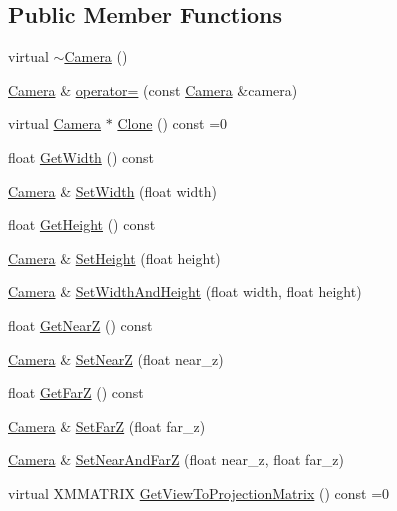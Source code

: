 \subsection*{Public Member Functions}
\begin{DoxyCompactItemize}
\item 
virtual \hyperlink{classmage_1_1_camera_ae56c0542ae1a480c7fb15d737bf16de0}{$\sim$\+Camera} ()
\item 
\hyperlink{classmage_1_1_camera}{Camera} \& \hyperlink{classmage_1_1_camera_ae16a5f66b80f7fa771475aa1eb099634}{operator=} (const \hyperlink{classmage_1_1_camera}{Camera} \&camera)
\item 
virtual \hyperlink{classmage_1_1_camera}{Camera} $\ast$ \hyperlink{classmage_1_1_camera_a19301c2256c183db50b5e9406f7b5f3c}{Clone} () const =0
\item 
float \hyperlink{classmage_1_1_camera_a2285655605035118861297b2449a3443}{Get\+Width} () const
\item 
\hyperlink{classmage_1_1_camera}{Camera} \& \hyperlink{classmage_1_1_camera_acddfb1108ee8f7e937833286c082dadf}{Set\+Width} (float width)
\item 
float \hyperlink{classmage_1_1_camera_a4c6c5e96085651ce29cd6e87543d21ec}{Get\+Height} () const
\item 
\hyperlink{classmage_1_1_camera}{Camera} \& \hyperlink{classmage_1_1_camera_a83ab1d3345b3fc318608c016b6b523d9}{Set\+Height} (float height)
\item 
\hyperlink{classmage_1_1_camera}{Camera} \& \hyperlink{classmage_1_1_camera_a275b6908662c0cde4fec5485ff04a846}{Set\+Width\+And\+Height} (float width, float height)
\item 
float \hyperlink{classmage_1_1_camera_a175e3c36526a8a3e28cd2f8bd1701c55}{Get\+NearZ} () const
\item 
\hyperlink{classmage_1_1_camera}{Camera} \& \hyperlink{classmage_1_1_camera_ae2e148f1ff5128442927abc87114a739}{Set\+NearZ} (float near\+\_\+z)
\item 
float \hyperlink{classmage_1_1_camera_a7f293a8711086b3419fe3b4224ff2778}{Get\+FarZ} () const
\item 
\hyperlink{classmage_1_1_camera}{Camera} \& \hyperlink{classmage_1_1_camera_acd1ab15368f052b846f72b92a52a94c5}{Set\+FarZ} (float far\+\_\+z)
\item 
\hyperlink{classmage_1_1_camera}{Camera} \& \hyperlink{classmage_1_1_camera_a8cb00dc1b8455197412c80f321011dc1}{Set\+Near\+And\+FarZ} (float near\+\_\+z, float far\+\_\+z)
\item 
virtual X\+M\+M\+A\+T\+R\+IX \hyperlink{classmage_1_1_camera_a1f5206864cf18b5548219492556df5d2}{Get\+View\+To\+Projection\+Matrix} () const =0
\end{DoxyCompactItemize}
